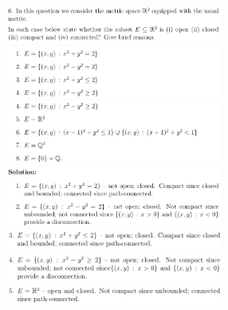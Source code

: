 \documentclass[8pt,landscape]{article}
\begin{document}
\begin{multicols}{3}
    \includegraphics[width=270]{153.png} \\
    \includegraphics[width=270]{154.png} \\
    \includegraphics[width=270]{155.png} \\
    \includegraphics[width=270]{156.png} \\
    \includegraphics[width=270]{157.png} \\
    \includegraphics[width=270]{158.png} \\
    \includegraphics[width=270]{159.png} \\

\end{multicols}
\end{document}
